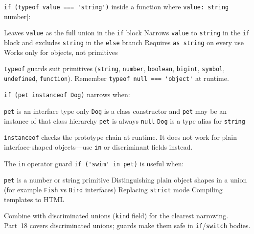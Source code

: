 \question[4]
\lstinline[style=tsinline]|if (typeof value === 'string')| inside a function where \lstinline[style=tsinline]|value: string | number|:
\begin{choices}
  \choice Leaves \lstinline[style=tsinline]|value| as the full union in the \texttt{if} block
  \CorrectChoice Narrows \lstinline[style=tsinline]|value| to \lstinline[style=tsinline]|string| in the \texttt{if} block and excludes \lstinline[style=tsinline]|string| in the \texttt{else} branch
  \choice Requires \lstinline[style=tsinline]|as string| on every use
  \choice Works only for objects, not primitives
\end{choices}
\begin{solution}
  \lstinline[style=tsinline]|typeof| guards suit primitives (\lstinline[style=tsinline]|string|, \lstinline[style=tsinline]|number|, \lstinline[style=tsinline]|boolean|, \lstinline[style=tsinline]|bigint|, \lstinline[style=tsinline]|symbol|, \lstinline[style=tsinline]|undefined|, \lstinline[style=tsinline]|function|). Remember \lstinline[style=tsinline]|typeof null === 'object'| at runtime.
\end{solution}

\question[4]
\lstinline[style=tsinline]|if (pet instanceof Dog)| narrows when:
\begin{choices}
  \choice \lstinline[style=tsinline]|pet| is an interface type only
  \CorrectChoice \lstinline[style=tsinline]|Dog| is a class constructor and \lstinline[style=tsinline]|pet| may be an instance of that class hierarchy
  \choice \lstinline[style=tsinline]|pet| is always \lstinline[style=tsinline]|null|
  \choice \lstinline[style=tsinline]|Dog| is a type alias for \lstinline[style=tsinline]|string|
\end{choices}
\begin{solution}
  \lstinline[style=tsinline]|instanceof| checks the prototype chain at runtime. It does not work for plain interface-shaped objects---use \lstinline[style=tsinline]|in| or discriminant fields instead.
\end{solution}

\question[4]
The \lstinline[style=tsinline]|in| operator guard \lstinline[style=tsinline]|if ('swim' in pet)| is useful when:
\begin{choices}
  \choice \lstinline[style=tsinline]|pet| is a number or string primitive
  \CorrectChoice Distinguishing plain object shapes in a union (for example \lstinline[style=tsinline]|Fish| vs \lstinline[style=tsinline]|Bird| interfaces)
  \choice Replacing \lstinline[style=tsinline]|strict| mode
  \choice Compiling templates to HTML
\end{choices}
\begin{solution}
  Combine with discriminated unions (\lstinline[style=tsinline]|kind| field) for the clearest narrowing. Part~18 covers discriminated unions; guards make them safe in \lstinline[style=tsinline]|if|/\lstinline[style=tsinline]|switch| bodies.
\end{solution}

